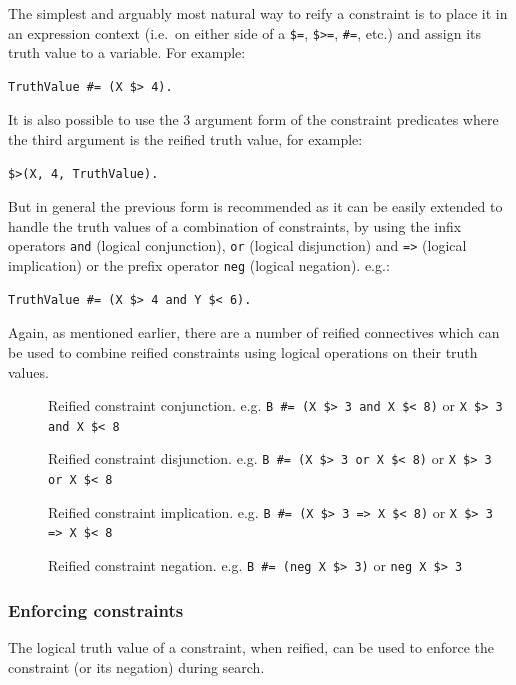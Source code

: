 The simplest and arguably most natural way to reify a constraint is to
place it in an expression context (i.e.\ on either side of a \verb|$=|,
\verb|$>=|, \verb|#=|, etc.) and assign its truth value to a variable.
For example:

\begin{verbatim}
TruthValue #= (X $> 4).
\end{verbatim}

It is also possible to use the 3 argument form of the constraint predicates
where the third argument is the reified truth value, for example:

\begin{verbatim}
$>(X, 4, TruthValue).
\end{verbatim}

But in general the previous form is recommended as it can be easily
extended to handle the truth values of a combination of constraints, by
using the infix operators \verb|and| (logical conjunction), \verb|or|
(logical disjunction) and \verb|=>| (logical implication) or the prefix
operator \verb|neg| (logical negation). e.g.:

\begin{verbatim}
TruthValue #= (X $> 4 and Y $< 6).
\end{verbatim}

Again, as mentioned earlier, there are a number of reified connectives
which can be used to combine reified constraints using logical
operations on their truth values.
\begin{description}
\item[] Reified constraint conjunction. e.g.
\verb|B #= (X $> 3 and X $< 8)| or
\verb|X $> 3 and X $< 8|

\item[] Reified constraint disjunction. e.g.
\verb|B #= (X $> 3 or X $< 8)| or
\verb|X $> 3 or X $< 8|

\item[] Reified constraint implication. e.g.
\verb|B #= (X $> 3 => X $< 8)| or
\verb|X $> 3 => X $< 8|

\item[] Reified constraint negation. e.g.
\verb|B #= (neg X $> 3)| or
\verb|neg X $> 3|
\end{description}




\subsubsection{Enforcing constraints}
The logical truth value of a constraint, when reified, can be used to
enforce the constraint (or its negation) during search.

